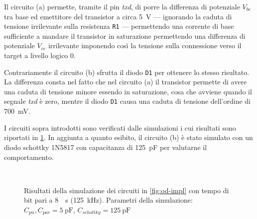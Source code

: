 Il circuito (a) permette, tramite il pin \textit{txd}, di porre la differenza di potenziale \(V_{be}\) tra base ed emettitore del transistor a circa \SI{5}{\volt} --- ignorando la caduta di tensione irrilevante sulla resistenza \texttt{R1} --- permettendo una corrente di base sufficiente a mandare il transistor in saturazione permettendo una differenza di potenziale \(V_{ce}\) irrilevante imponendo così la tensione sulla connessione verso il target a livello logico 0.

Contrariamente il circuito (b) sfrutta il diodo \texttt{D1} per ottenere lo stesso risultato. La differenza consta nel fatto che nel circuito (a) il transistor permette di avere una caduta di tensione minore essendo in saturazione, cosa che avviene quando il segnale \textit{txd} è zero, mentre il diodo \texttt{D1} causa una caduta di tensione dell'ordine di \SI{700}{\milli\volt}.

I circuiti sopra introdotti sono verificati dalle simulazioni i cui risultati sono riportati in \cref{graph:sim}. In aggiunta a quanto esibito, il circuito (b) è stato simulato con un diodo schottky 1N5817 con capacitanza di \SI{125}{\pico\farad} per valutarne il comportamento.

\begin{figure}
    \centering
        \\
        \vfill
    \caption[]{Risultati della simulazione dei circuiti in \cref{fig:od-impl} con tempo di bit pari a \SI{8}{\text{\mu}\second} (\SI{125}{\kilo\hertz}). Parametri della simulazione: \(C_{pn}, C_{par} = \SI{5}{\pico\farad}\), \(C_{schottky} = \SI{125}{\pico\farad}\)}\label{graph:sim}
\end{figure}

